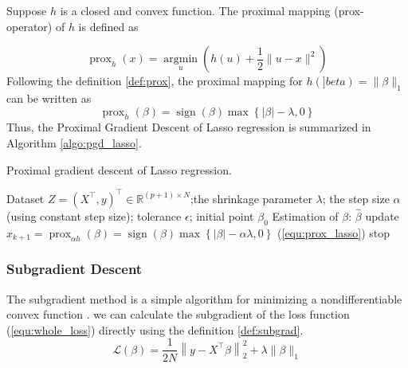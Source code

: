 \documentclass[11pt,en,authoryear]{elegantpaper}
\numberwithin{equation}{section}
\newcommand{\mbR}{\mathbb{R}}
\begin{document}
\begin{definition}\label{def:prox}
Suppose $h$ is a closed and convex function. The proximal mapping (prox-operator)
of $h$ is defined as
\end{definition}

\begin{equation}
\operatorname{prox}_{h}(x)=\underset{u}{\operatorname{argmin}}\left(h(u)+\frac{1}{2}\|u-x\|^{2}\right)
\end{equation}
Following the definition \ref{def:prox}, the proximal mapping for $h(]beta) = \|\beta \|_1$ can be written as
\begin{equation}\label{equ:prox_lasso}
    \operatorname{prox}_{h}(\beta) = \operatorname{sign}(\beta) \max \left\{|\beta|-\lambda, 0\right\}
\end{equation}
Thus, the Proximal Gradient Descent of Lasso regression is summarized in Algorithm \ref{algo:pgd_lasso}.

\begin{center}
\begin{minipage}{13.5cm}
	  \begin{algorithm}[H]
  \caption{Proximal gradient descent of Lasso regression.}\label{algo:pgd_lasso}
  \begin{algorithmic}[1]
    \Require
      Dataset $Z = (X^{\top}, y)^{\top} \in \mbR^{(p+1) \times N}$;the shrinkage parameter $\lambda$;  the step size $\alpha$ (using constant step size); tolerance $\epsilon$; initial point $\beta_0$
    \Ensure Estimation of $\beta$: $\hat{\beta}$
    {
    \State update $x_{k+1}= \operatorname{prox}_{\alpha h}(\beta) = \operatorname{sign}(\beta) \max \left\{|\beta|-\alpha \lambda, 0\right\}$ \quad (\ref{equ:prox_lasso})
    \State stop
    \EndIf
    }
    \EndFor
  \end{algorithmic}
\end{algorithm}
\end{minipage}
\end{center}



\subsubsection{Subgradient Descent}

The subgradient method is a simple algorithm for minimizing a nondifferentiable convex function \citep{boyd2003subgradient}. we can calculate the subgradient of the loss function (\ref{equ:whole_loss}) directly using the definition \ref{def:subgrad}.
\begin{equation}\label{equ:whole_loss}
    \mathcal{L}(\beta) = \frac{1}{2N} \left\|y - X^{\top}\beta \right\|_2^2 + \lambda \|\beta \|_1
\end{equation}
\end{document}
